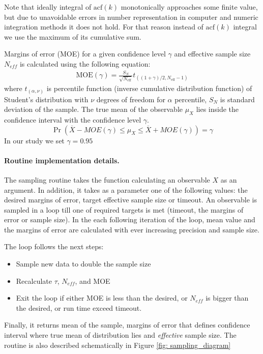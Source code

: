 \documentclass[journal=mamobx, layout=twocolumns,manuscript=article]{achemso}
\begin{document}
Note that ideally integral of  $\text{acf} (k)$ monotonically approaches some finite value, but due to unavoidable errors in number representation in computer and numeric integration methods it does not hold. 
For that reason instead of $\text{acf} (k)$ integral we use the maximum of its cumulative sum.

Margins of error (MOE) for a given confidence level $\gamma$ and effective sample size $N_{eff}$ is calculated using the following equation:
\begin{eqnarray}
    \text{MOE}(\gamma) = \frac{S_{N}}{\sqrt{N_{\text{eff}}}} t_{((1+\gamma)/2, N_{\text{eff}}-1)}
\end{eqnarray}
where $t_{(\alpha, \nu)}$ is percentile function (inverse cumulative distribution function) of Student’s distribution with $\nu$ degrees of freedom for $\alpha$ percentile,
$S_N$ is standard deviation of the sample.
The true mean of the observable $\mu_X$ lies inside the confidence interval with the confidence level $\gamma$.
\begin{equation}
    \Pr(\overline{X} - MOE(\gamma) \leq \mu_X \leq \overline{X} + MOE(\gamma)) = \gamma
\end{equation}
In our study we set $\gamma = 0.95$


\paragraph{Routine implementation details.}

The sampling routine takes the function calculating an observable $X$ as an argument. 
In addition, it takes as a parameter one of the following values: the desired margins of error, target effective sample size or timeout.
An observable is sampled in a loop till one of required targets is met (timeout, the margins of error or sample size). 
In the each following iteration of the loop, mean value and the margins of error are calculated with ever increasing precision and sample size. 

The loop follows the next steps:
\begin{itemize}
    \item Sample new data to double the sample size
    \item Recalculate $\tau$, $N_{eff}$, and MOE
    \item Exit the loop if either MOE is less than the desired, 
    			or $N_{eff}$ is bigger than the desired, 
    			or run time exceed timeout.
\end{itemize}
Finally, it returns mean of the sample, margins of error that defines confidence interval where true mean of distribution lies and \emph{effective} sample size. 
The routine is also described schematically in Figure \ref{fig: sampling_diagram}
\end{document}
